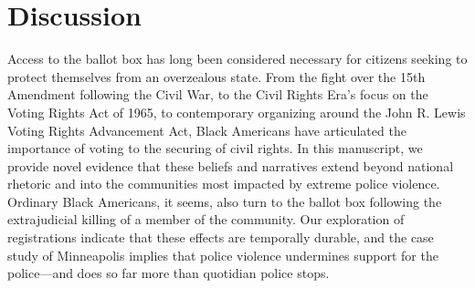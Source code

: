 \documentclass[12pt]{article}
\begin{document}
\section*{Discussion}

Access to the ballot box has long been considered necessary for citizens seeking to protect themselves from an overzealous state. From the fight over the 15th Amendment following the Civil War, to the Civil Rights Era's focus on the Voting Rights Act of 1965, to contemporary organizing around the John R. Lewis Voting Rights Advancement Act, Black Americans have articulated the importance of voting to the securing of civil rights. In this manuscript, we provide novel evidence that these beliefs and narratives extend beyond national rhetoric and into the communities most impacted by extreme police violence. Ordinary Black Americans, it seems, also turn to the ballot box following the extrajudicial killing of a member of the community. Our exploration of registrations indicate that these effects are temporally durable, and the case study of Minneapolis implies that police violence undermines support for the police---and does so far more than quotidian police stops.
\end{document}
